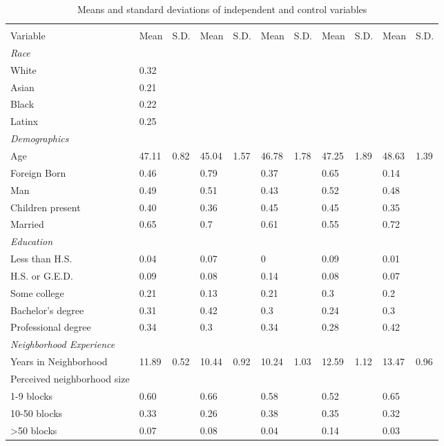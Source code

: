 % 
\begin{sidewaystable}[ht]
\centering
\caption{Means and standard deviations of independent and control variables} 
\label{tab:descriptives}
\begin{tabular}{lR{.4in}R{.4in}R{.4in}R{.4in}R{.4in}R{.4in}R{.4in}R{.4in}R{.4in}R{.4in}}
  \toprule
&  &  &  &  &  \\
Variable & Mean & S.D. & Mean & S.D. & Mean & S.D. & Mean & S.D. & Mean & S.D. \\ 
  \midrule
\emph{Race}&&\\White &  0.32 &  &  &  &  &  &  &  &  &  \\ 
  Asian &  0.21 &  &  &  &  &  &  &  &  &  \\ 
  Black &  0.22 &  &  &  &  &  &  &  &  &  \\ 
  Latinx\vspace{1em} &  0.25 &  &  &  &  &  &  &  &  &  \\ 
  \emph{Demographics}&&\\Age & 47.11 & 0.82 & 45.04 & 1.57 & 46.78 & 1.78 & 47.25 & 1.89 & 48.63 & 1.39 \\ 
  Foreign Born &  0.46 &  & 0.79 &  & 0.37 &  & 0.65 &  & 0.14 &  \\ 
  Man &  0.49 &  & 0.51 &  & 0.43 &  & 0.52 &  & 0.48 &  \\ 
  Children present &  0.40 &  & 0.36 &  & 0.45 &  & 0.45 &  & 0.35 &  \\ 
  Married\vspace{1em} &  0.65 &  & 0.7 &  & 0.61 &  & 0.55 &  & 0.72 &  \\ 
  \emph{Education}&&\\Less than H.S. &  0.04 &  & 0.07 &  & 0 &  & 0.09 &  & 0.01 &  \\ 
  H.S. or G.E.D. &  0.09 &  & 0.08 &  & 0.14 &  & 0.08 &  & 0.07 &  \\ 
  Some college &  0.21 &  & 0.13 &  & 0.21 &  & 0.3 &  & 0.2 &  \\ 
  Bachelor's degree &  0.31 &  & 0.42 &  & 0.3 &  & 0.24 &  & 0.3 &  \\ 
  Professional degree\vspace{1em} &  0.34 &  & 0.3 &  & 0.34 &  & 0.28 &  & 0.42 &  \\ 
  \emph{Neighborhood Experience}\\Years in Neighborhood & 11.89 & 0.52 & 10.44 & 0.92 & 10.24 & 1.03 & 12.59 & 1.12 & 13.47 & 0.96 \\ 
  Perceived neighborhood size\\1-9 blocks &  0.60 &  & 0.66 &  & 0.58 &  & 0.52 &  & 0.65 &  \\ 
  10-50 blocks &  0.33 &  & 0.26 &  & 0.38 &  & 0.35 &  & 0.32 &  \\ 
  >50 blocks &  0.07 &  & 0.08 &  & 0.04 &  & 0.14 &  & 0.03 &  \\ 
   \bottomrule
\end{tabular}
\end{sidewaystable}
